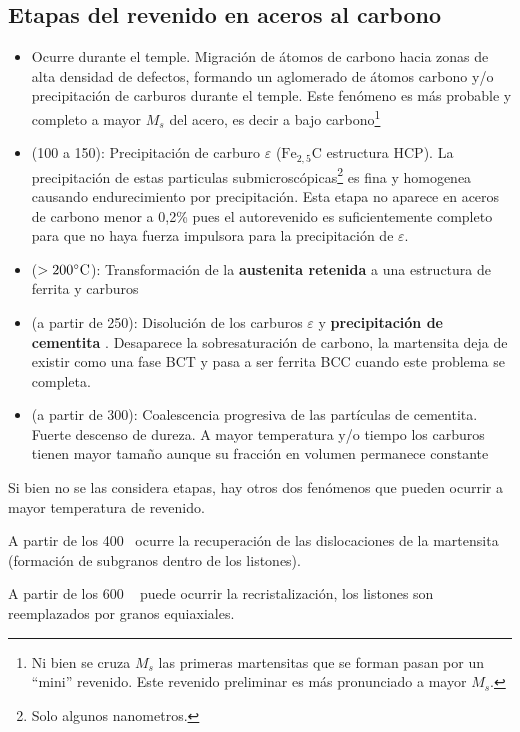 \subsection{Etapas del revenido en aceros al carbono}

\begin{itemize}
    \item[Autorevenido] Ocurre durante el temple. Migración de átomos de carbono hacia zonas de alta densidad de defectos, formando un aglomerado de átomos carbono y/o precipitación de carburos durante el temple. Este fenómeno es más probable y completo a mayor $M_s$ del acero, es decir a bajo carbono\footnote{Ni bien se cruza $M_s$ las primeras martensitas que se forman pasan por un ``mini'' revenido. Este revenido preliminar es más pronunciado a mayor $M_s$.}
    \item[Etapa 1] (100 a 150\grad): Precipitación de carburo $\varepsilon$ ($\mathrm{Fe}_{2,5}\mathrm{C}$ estructura HCP). La precipitación de estas particulas submicroscópicas\footnote{Solo algunos nanometros.} es fina y homogenea causando endurecimiento por precipitación. Esta etapa no aparece en aceros de carbono menor a 0,2\% pues el autorevenido es suficientemente completo para que no haya fuerza impulsora para la precipitación de $\varepsilon$.
    \item[Etapa 2] ($>200^\circ \mathrm{C}$): Transformación de la\textbf{ austenita retenida} a una estructura de ferrita y carburos
    \item [Etapa 3] (a partir de 250\grad): Disolución de los carburos $\varepsilon$ y \textbf{precipitación de cementita} \cementita. Desaparece la sobresaturación de carbono, la martensita deja de existir como una fase BCT y pasa a ser ferrita BCC cuando este problema se completa.
    \item[Etapa 4] (a partir de 300\grad): Coalescencia progresiva de las partículas de cementita. Fuerte descenso de dureza. A mayor temperatura y/o tiempo los carburos tienen mayor tamaño aunque su fracción en volumen permanece constante
\end{itemize}

Si bien no se las considera etapas, hay otros dos fenómenos que pueden
ocurrir a mayor temperatura de revenido.

A partir de los 400\grad~ ocurre la recuperación de las dislocaciones de la
martensita (formación de subgranos dentro de los listones).


A partir de los 600 \grad~ puede ocurrir la recristalización, los listones son
reemplazados por granos equiaxiales.

